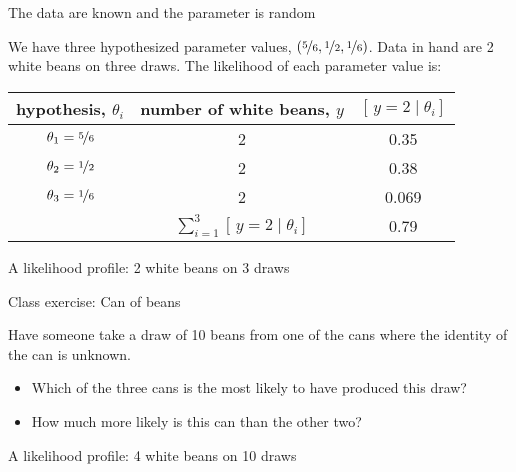 \documentclass[ignorenonframetext,]{beamer}
\providecommand{\tightlist}{%
  \setlength{\itemsep}{0pt}\setlength{\parskip}{0pt}}
\begin{document}
\begin{frame}{The data are known and the parameter is random}

We have three hypothesized parameter values,
\((\nicefrac{5}{6}, \nicefrac{1}{2}, \nicefrac{1}{6})\). Data in hand
are 2 white beans on three draws. The likelihood of each parameter value
is:

\bigskip \center

\begin{tabular}{|c|c|c|}
\hline 
hypothesis, $\theta_{i}$ & number of white beans, $y$ & $[\, y=2 \mid \theta_{i}]$\tabularnewline
\hline 
\hline 
$\theta_{1}=\nicefrac{5}{6}$ & 2 & 0.35\tabularnewline
\hline 
$\theta_{2}=\nicefrac{1}{2}$ & 2 & 0.38\tabularnewline
\hline 
$\theta_{3}=\nicefrac{1}{6}$ &  2 & 0.069\tabularnewline
\hline 
& $\sum_{i=1}^{3}[\, y=2 \mid \theta_{i}]$ & 0.79\tabularnewline
\hline 
\end{tabular}

\end{frame}

\begin{frame}{A likelihood profile: 2 white beans on 3 draws}

\begin{center}

\end{center}

\end{frame}

\begin{frame}{Class exercise: Can of beans}

Have someone take a draw of 10 beans from one of the cans where the
identity of the can is unknown.

\begin{itemize}
\tightlist
\item
  Which of the three cans is the most likely to have produced this draw?
\item
  How much more likely is this can than the other two?
\end{itemize}

\end{frame}

\begin{frame}{A likelihood profile: 4 white beans on 10 draws}

\begin{center}

\end{center}

\end{frame}
\end{document}

